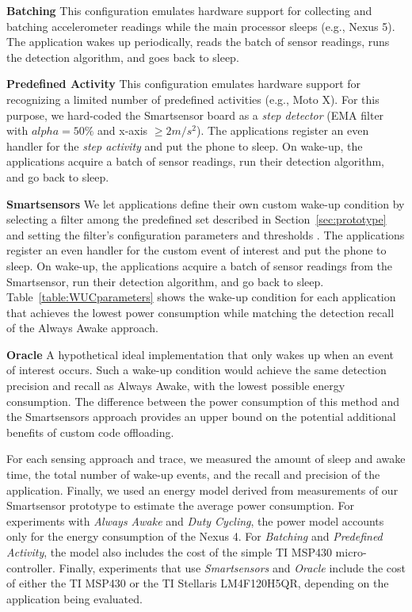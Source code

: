 \textbf{Batching} This configuration emulates hardware support for
collecting and batching accelerometer readings while the main
processor sleeps (e.g., Nexus 5).  The application wakes up
periodically, reads the batch of sensor readings, runs the detection
algorithm, and goes back to sleep.

\textbf{Predefined Activity} This configuration emulates hardware
support for recognizing a limited number of predefined activities
(e.g., Moto X).  For this purpose, we hard-coded the Smartsensor board
as a {\em step detector} (EMA filter with $alpha = 50\%$ and x-axis
$\ge 2 m/s^2$).  The applications register an even handler for the {\em
  step activity} and put the phone to sleep.  On wake-up, the
applications acquire a batch of sensor readings, run their detection
algorithm, and go back to sleep.

\textbf{Smartsensors} We let applications define their own custom wake-up 
condition by selecting a filter among the predefined set described
in Section~\ref{sec:prototype} and setting the filter's configuration
parameters and thresholds .  The applications register an even handler
for the custom event of interest and put the phone to sleep.  On
wake-up, the applications acquire a batch of sensor readings from the
Smartsensor, run their detection algorithm, and go back to sleep.
Table~\ref{table:WUCparameters} shows the wake-up condition for each
application that achieves the lowest power consumption while matching
the detection recall of the Always Awake approach.

\textbf{Oracle} A hypothetical ideal implementation that only wakes up
when an event of interest occurs.  Such a wake-up condition would
achieve the same detection precision and recall as Always Awake, with
the lowest possible energy consumption. The difference between the
power consumption of this method and the Smartsensors approach
provides an upper bound on the potential additional benefits of custom
code offloading.

For each sensing approach and trace, we measured the amount of sleep
and awake time, the total number of wake-up events, and the recall and
precision of the application.  Finally, we used an energy model
derived from measurements of our Smartsensor prototype to estimate
the average power consumption.  For experiments with {\em Always Awake}
and {\em Duty Cycling}, the power model accounts only for the energy
consumption of the Nexus 4.  For {\em Batching} and {\em Predefined Activity},
the model also includes the cost of the simple TI MSP430
micro-controller.  Finally, experiments that use {\em Smartsensors} and {\em
  Oracle} include the cost of either the TI MSP430 or the TI Stellaris
LM4F120H5QR, depending on the application being evaluated.








